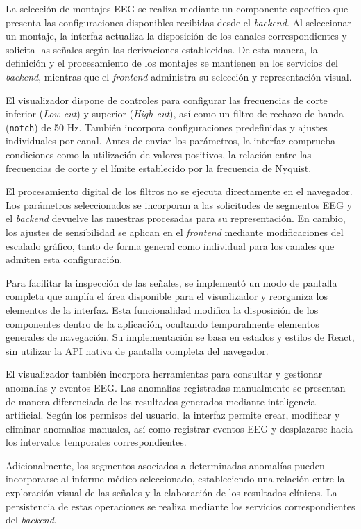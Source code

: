 La selección de montajes EEG se realiza
mediante un componente específico que
presenta las configuraciones disponibles
recibidas desde el \textit{backend}. Al seleccionar
un montaje, la interfaz actualiza la
disposición de los canales correspondientes
y solicita las señales según las derivaciones
establecidas. De esta manera, la definición
y el procesamiento de los montajes se
mantienen en los servicios del \textit{backend},
mientras que el \textit{frontend} administra su
selección y representación visual.

El visualizador dispone de controles para configurar las frecuencias de corte inferior (\textit{Low cut}) y superior (\textit{High cut}), así como un filtro de rechazo de banda (\texttt{notch}) de 50 Hz. También incorpora configuraciones
predefinidas y ajustes individuales por
canal. Antes de enviar los parámetros,
la interfaz comprueba condiciones como
la utilización de valores positivos,
la relación entre las frecuencias de
corte y el límite establecido por la
frecuencia de Nyquist.

El procesamiento digital de los filtros
no se ejecuta directamente en el navegador.
Los parámetros seleccionados se incorporan
a las solicitudes de segmentos EEG y el
\textit{backend} devuelve las muestras procesadas
para su representación. En cambio, los
ajustes de sensibilidad se aplican en
el \textit{frontend} mediante modificaciones
del escalado gráfico, tanto de forma
general como individual para los canales
que admiten esta configuración.

Para facilitar la inspección de las
señales, se implementó un modo de pantalla completa
que amplía el área disponible para el
visualizador y reorganiza los elementos
de la interfaz. Esta funcionalidad
modifica la disposición de los componentes
dentro de la aplicación, ocultando
temporalmente elementos generales de
navegación. Su implementación se basa
en estados y estilos de React, sin
utilizar la API nativa de pantalla
completa del navegador.

El visualizador también incorpora
herramientas para consultar y gestionar
anomalías y eventos EEG. Las anomalías
registradas manualmente se presentan
de manera diferenciada de los resultados
generados mediante inteligencia artificial.
Según los permisos del usuario, la
interfaz permite crear, modificar y
eliminar anomalías manuales, así como
registrar eventos EEG y desplazarse
hacia los intervalos temporales
correspondientes.

Adicionalmente, los segmentos asociados
a determinadas anomalías pueden
incorporarse al informe médico
seleccionado, estableciendo una relación
entre la exploración visual de las señales
y la elaboración de los resultados
clínicos. La persistencia de estas
operaciones se realiza mediante los
servicios correspondientes del \textit{backend}.

